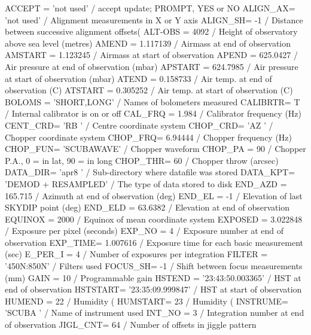 \documentclass[twoside,11pt]{starlink}
\begin{document}
\begin{terminalv}
ACCEPT  = 'not used'           / accept update; PROMPT, YES or NO
ALIGN_AX= 'not used'           / Alignment measurements in X or Y axis
ALIGN_SH=                   -1 / Distance between successive alignment offsets(
ALT-OBS =                 4092 / Height of observatory above sea level (metres)
AMEND   =             1.117139 / Airmass at end of observation
AMSTART =             1.123245 / Airmass at start of observation
APEND   =             625.0427 / Air pressure at end of observation (mbar)
APSTART =             624.7985 / Air pressure at start of observation (mbar)
ATEND   =             0.158733 / Air temp. at end of observation (C)
ATSTART =             0.305252 / Air temp. at start of observation (C)
BOLOMS  = 'SHORT,LONG'         / Names of bolometers measured
CALIBRTR=                    T / Internal calibrator is on or off
CAL_FRQ =                1.984 / Calibrator frequency (Hz)
CENT_CRD= 'RB      '           / Centre coordinate system
CHOP_CRD= 'AZ      '           / Chopper coordinate system
CHOP_FRQ=              6.94444 / Chopper frequency (Hz)
CHOP_FUN= 'SCUBAWAVE'          / Chopper waveform
CHOP_PA =                   90 / Chopper P.A., 0 = in lat, 90 = in long
CHOP_THR=                   60 / Chopper throw (arcsec)
DATA_DIR= 'apr8    '           / Sub-directory where datafile was stored
DATA_KPT= 'DEMOD + RESAMPLED'  / The type of data stored to disk
END_AZD =              165.715 / Azimuth at end of observation (deg)
END_EL  =                   -1 / Elevation of last SKYDIP point (deg)
END_ELD =              63.6382 / Elevation at end of observation
EQUINOX =                 2000 / Equinox of mean coordinate system
EXPOSED =             3.022848 / Exposure per pixel (seconds)
EXP_NO  =                    4 / Exposure number at end of observation
EXP_TIME=             1.007616 / Exposure time for each basic measurement (sec)
E_PER_I =                    4 / Number of exposures per integration
FILTER  = '450N:850N'          / Filters used
FOCUS_SH=                   -1 / Shift between focus measurements (mm)
GAIN    =                   10 / Programmable gain
HSTEND  = '23:43:50.003365'    / HST at end of observation
HSTSTART= '23:35:09.999847'    / HST at start of observation
HUMEND  =                   22 / Humidity (%
HUMSTART=                   23 / Humidity (%
INSTRUME= 'SCUBA   '           / Name of instrument used
INT_NO  =                    3 / Integration number at end of observation
JIGL_CNT=                   64 / Number of offsets in jiggle pattern

\end{terminalv}
\end{document}
